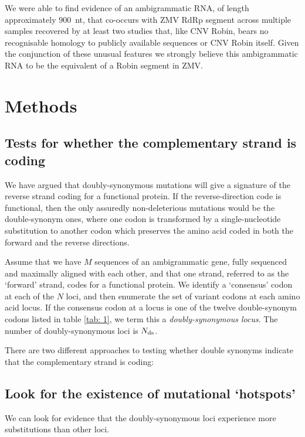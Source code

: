 \documentclass[unnumsec,webpdf,contemporary,large,namedate]{oup-authoring-template}%
\theoremstyle{thmstyleone}%
\theoremstyle{thmstyletwo}%
\theoremstyle{thmstylethree}%
\begin{document}
We were able to find evidence of an ambigrammatic RNA, of length approximately
$900$~nt, that co-occurs with ZMV RdRp segment across multiple samples
recovered by at least two studies that, like CNV Robin, bears no recognisable
homology to publicly available sequences or CNV Robin itself.  Given the
conjunction of these unusual features we strongly believe this ambigrammatic
RNA to be the equivalent of a Robin segment in ZMV.

\section{Methods}
\label{sec: 4}

\subsection{Tests for whether the complementary strand is coding}
\label{sec: 4.1}

We have argued that doubly-synonymous mutations will give a signature of the
reverse strand coding for a functional protein. If the reverse-direction code is functional,
then the only assuredly non-deleterious mutations would be the double-synonym ones,
where one codon is transformed by a single-nucleotide substitution to another
codon which preserves the amino acid coded in both the forward and
the reverse directions.

Assume that we have $M$ sequences of an ambigrammatic gene, fully sequenced and
maximally aligned with each other, and that one strand, referred to as the
\lq forward' strand, codes for a functional protein.
We identify a \lq consensus' codon at each of the $N$ loci,
and then enumerate the set of variant codons at each amino acid locus.
If the consensus codon at a locus is one of the twelve
double-synonym codons listed in table \ref{tab: 1}, we term this a \emph{doubly-synonymous locus}.
The number of doubly-synonymous loci is $N_{\rm ds}$.

There are two different approaches to testing whether
double synonyms indicate that the complementary strand is coding:

\subsection{Look for the existence of mutational \lq hotspots'}
\label{sec: 4.1}

We can look for evidence that the doubly-synonymous loci experience more substitutions than other loci.
\end{document}
